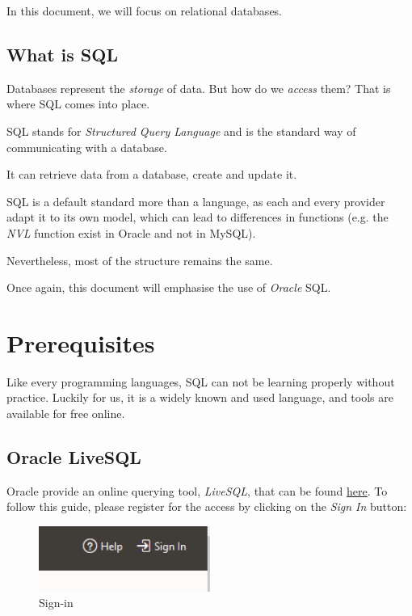 \documentclass[12pt, letterpaper]{report}
\begin{document}
In this document, we will focus on relational databases.

\section{What is SQL}

Databases represent the \textit{storage} of data. But how do we \textit{access} them?
That is where SQL comes into place.

SQL stands for \textit{Structured Query Language} and is the standard way of communicating with a database.

It can retrieve data from a database, create and update it.

SQL is a default standard more than a language, as each and every provider adapt it to its own model, which can lead to differences in functions (e.g. the \textit{NVL} function exist in Oracle and not in MySQL).

Nevertheless, most of the structure remains the same.

Once again, this document will emphasise the use of \textit{Oracle} SQL.

\chapter{Prerequisites}

Like every programming languages, SQL can not be learning properly without practice.
Luckily for us, it is a widely known and used language, and tools are available for free online.

\section{Oracle LiveSQL}

Oracle provide an online querying tool, \textit{LiveSQL}, that can be found \href{https://livesql.oracle.com}{here}.
To follow this guide, please register for the access by clicking on the \textit{Sign In} button:

\begin{figure}[H]
	\centering
	\includegraphics[width=0.5\textwidth]{livesql_signin}
	\caption{Sign-in}
\end{figure}
\end{document}
